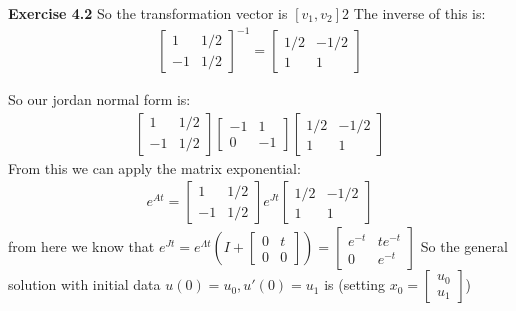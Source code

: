 \documentclass[12pt]{article}
\newenvironment{exercise}[1]{\vspace{.1in}\noindent\textbf{Exercise #1 \hspace{.05em}}}{}
\theoremstyle{definition}
\theoremstyle{remark}
\begin{document}
\begin{exercise}{4.2}
	So the transformation vector is $[v_1,v_2]2$ The inverse of this is:
	\begin{align}
		\begin{bmatrix}
			1  & 1/2 \\
			-1 & 1/2
		\end{bmatrix}^{-1}=%
		\begin{bmatrix}
			1/2 & -1/2 \\
			1   & 1
		\end{bmatrix}
	\end{align}

	So our jordan normal form is:
	\begin{align}
		\begin{bmatrix}
			1  & 1/2 \\
			-1 & 1/2
		\end{bmatrix} %
		\begin{bmatrix}
			-1 & 1  \\
			0  & -1
		\end{bmatrix}\begin{bmatrix}
			             1/2 & -1/2 \\
			             1   & 1
		             \end{bmatrix}
	\end{align}
	From this we can apply the matrix exponential:
	\begin{align}
		e^{At}=
		\begin{bmatrix}
			1  & 1/2 \\
			-1 & 1/2
		\end{bmatrix} %
		e^{Jt}\begin{bmatrix}
			      1/2 & -1/2 \\
			      1   & 1
		      \end{bmatrix}
	\end{align}
	from here we know that $e^{Jt}=e^{\Lambda t}(I+%
		\begin{bmatrix}
			0 & t \\
			0 & 0
		\end{bmatrix})=%
		\begin{bmatrix}
			e^{-t} & te^{-t} \\
			0      & e^{-t}
		\end{bmatrix}$
	So the general solution with initial data $u(0)=u_0,u'(0)=u_1$ is (setting $x_0=%
		\begin{bmatrix}
			u_0 \\
			u_1
		\end{bmatrix}$)

\end{exercise}
\end{document}
